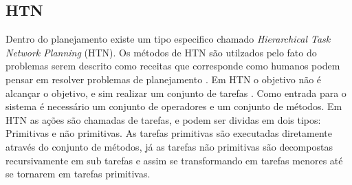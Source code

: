 





\subsection{HTN} 
Dentro do planejamento existe um tipo especifico chamado \textit{Hierarchical Task Network Planning} (HTN). Os métodos de HTN são utilzados pelo fato do problemas serem descrito como receitas que corresponde como humanos podem pensar em resolver problemas de planejamento \cite{ghallab2004automated}.  
Em HTN o objetivo não é alcançar o objetivo, e sim realizar um conjunto de tarefas \cite{ghallab2004automated}. Como entrada para o sistema é necessário um conjunto de operadores e um conjunto de métodos. Em HTN as ações são chamadas de tarefas, e podem ser dividas em dois tipos: Primitivas e não primitivas. As tarefas primitivas são executadas diretamente através do conjunto de métodos, já as tarefas não primitivas são decompostas recursivamente em sub tarefas e assim se transformando em tarefas menores até se tornarem em tarefas primitivas. \\

